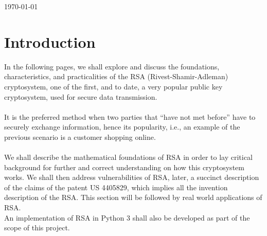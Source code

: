 \documentclass[12pt, a4paper]{article}
\begin{document}
\begin{titlepage}
		
		
		\vfill\vfill\vfill %
		
		{\large\today} %
		
		
		
		
		\vfill %
		
	\end{titlepage}
	

\section{Introduction}
In the following pages, we shall explore and discuss the foundations, characteristics, and practicalities of the RSA (Rivest-Shamir-Adleman) cryptosystem, one of the first, and to date, a very popular public key cryptosystem, used for secure data transmission. \\ \\
It is the preferred method when two parties that “have not met before” have to securely exchange information, hence its popularity, i.e., an example of the previous scenario is a customer shopping online.\\ \\
We shall describe the mathematical foundations of RSA in order to lay critical background for further and correct understanding on how this cryptosystem works. We shall then address vulnerabilities of RSA, later, a succinct description of the claims of the patent US 4405829, which implies all the invention description of the RSA. This section will be followed by real world applications of RSA. \\
An implementation of RSA in Python 3 shall also be developed as part of the scope of this project.
\end{document}
